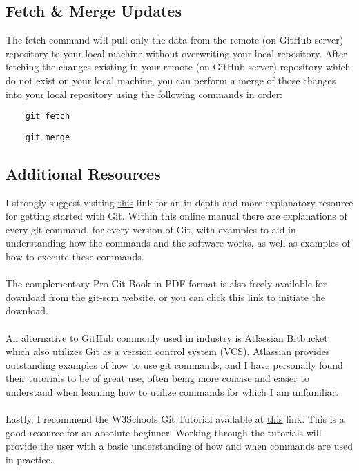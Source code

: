 \documentclass{article}
\begin{document}
\subsection{Fetch \& Merge Updates}
The fetch command will pull only the data from the remote (on GitHub server) repository to your local machine without overwriting your local repository. After fetching the changes existing in your remote (on GitHub server) repository which do not exist on your local machine, you can perform a merge of those changes into your local repository using the following commands in order:
\begin{verbatim}
    git fetch
\end{verbatim}
\begin{verbatim}
    git merge
\end{verbatim}

\subsection*{Additional Resources}
I strongly suggest visiting \href{https://git-scm.com/book/en/v2/Getting-Started-About-Version-Control}{this} link for an in-depth and more explanatory resource for getting started with Git. Within this online manual there are explanations of every git command, for every version of Git, with examples to aid in understanding how the commands and the software works, as well as examples of how to execute these commands.\\\\
The complementary Pro Git Book in PDF format is also freely available for download from the git-scm website, or you can click \href{https://github.com/progit/progit2/releases/download/2.1.360/progit.pdf}{this} link to initiate the download.\\\\
An alternative to GitHub commonly used in industry is Atlassian Bitbucket which also utilizes Git as a version control system (VCS). Atlassian provides outstanding examples of how to use git commands, and I have personally found their tutorials to be of great use, often being more concise and easier to understand when learning how to utilize commands for which I am unfamiliar.\\\\
Lastly, I recommend the W3Schools Git Tutorial available at \href{https://www.w3schools.com/git/}{this} link. This is a good resource for an absolute beginner. Working through the tutorials will provide the user with a basic understanding of how and when commands are used in practice. 
\end{document}
